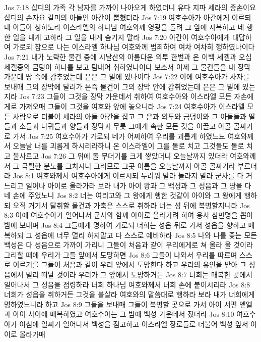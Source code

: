 Jos 7:18  삽디의 가족 각 남자를 가까이 나아오게 하였더니 유다 지파 세라의 증손이요 삽디의 손자요 갈미의 아들인 아간이 뽑혔더라
Jos 7:19  여호수아가 아간에게 이르되 내 아들아 청하노라 이스라엘의 하나님 여호와께 영광을 돌려 그 앞에 자복하고 네 행한 일을 내게 고하라 그 일을 내게 숨기지 말라
Jos 7:20  아간이 여호수아에게 대답하여 가로되 참으로 나는 이스라엘 하나님 여호와께 범죄하여 여차 여차히 행하였나이다
Jos 7:21  내가 노략한 물건 중에 시날산의 아름다운 외투 한벌과 은 이백 세겔과 오십 세겔중의 금덩이 하나를 보고 탐내어 취하였나이다 보소서 이제 그 물건들을 내 장막 가운데 땅 속에 감추었는데 은은 그 밑에 있나이다
Jos 7:22  이에 여호수아가 사자를 보내매 그의 장막에 달려가 본즉 물건이 그의 장막 안에 감취었는데 은은 그 밑에 있는지라
Jos 7:23  그들이 그것을 장막 가운데서 취하여 여호수아와 이스라엘 모든 자손에게로 가져오매 그들이 그것을 여호와 앞에 놓으니라
Jos 7:24  여호수아가 이스라엘 모든 사람으로 더불어 세라의 아들 아간을 잡고 그 은과 외투와 금덩이와 그 아들들과 딸들과 소들과 나귀들과 양들과 장막과 무릇 그에게 속한 모든 것을 이끌고 아골 골짜기로 가서
Jos 7:25  여호수아가 가로되 네가 어찌하여 우리를 괴롭게 하였느뇨 여호와께서 오늘날 너를 괴롭게 하시리라하니 온 이스라엘이 그를 돌로 치고 그것들도 돌로 치고 불사르고
Jos 7:26  그 위에 돌 무더기를 크게 쌓았더니 오늘날까지 있더라 여호와께서 그 극렬한 분노를 그치시니 그러므로 그곳 이름을 오늘날까지 아골 골짜기라 부르더라
Jos 8:1  여호와께서 여호수아에게 이르시되 두려워 말라 놀라지 말라 군사를 다 거느리고 일어나 아이로 올라가라 보라 내가 아이 왕과 그 백성과 그 성읍과 그 땅을 다 네 손에 주었노니
Jos 8:2  너는 여리고와 그 왕에게 행한 것같이 아이와 그 왕에게 행하되 오직 거기서 탈취할 물건과 가축은 스스로 취하라 너는 성 뒤에 복병할지니라
Jos 8:3  이에 여호수아가 일어나서 군사와 함께 아이로 올라가려 하여 용사 삼만명을 뽑아 밤에 보내며
Jos 8:4  그들에게 명하여 가로되 너희는 성읍 뒤로 가서 성읍을 향하고 매복하되 그 성읍에 너무 멀리 하지말고 다 스스로 예비하라
Jos 8:5  나와 나를 좇는 모든 백성은 다 성읍으로 가까이 가리니 그들이 처음과 같이 우리에게로 쳐 올라 올 것이라 그리할 때에 우리가 그들 앞에서 도망하면
Jos 8:6  그들이 나와서 우리를 따르며 스스로 이르기를 그들이 처음과 같이 우리 앞에서 도망한다 하고 우리의 유인을 받아 그 성읍에서 멀리 떠날 것이라 우리가 그 앞에서 도망하거든
Jos 8:7  너희는 매복한 곳에서 일어나서 그 성읍을 점령하라 너희 하나님 여호와께서 너희 손에 붙이시리라
Jos 8:8  너희가 성읍을 취하거든 그것을 불살라 여호와의 말씀대로 행하라 보라 내가 너희에게 명하였느니라 하고
Jos 8:9  그들을 보내매 그들이 복병할 곳으로 가서 아이 서편 벧엘과 아이 사이에 매복하였고 여호수아는 그 밤에 백성 가운데서 잤더라
Jos 8:10  여호수아가 아침에 일찌기 일어나서 백성을 점고하고 이스라엘 장로들로 더불어 백성 앞서 아이로 올라가매

